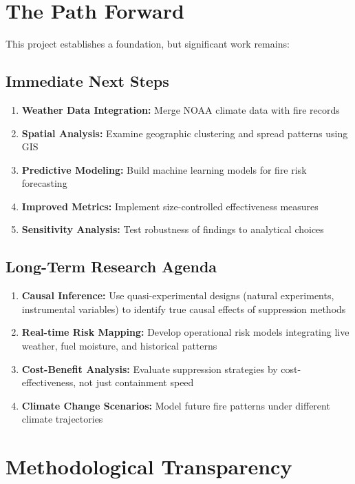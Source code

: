 \documentclass[11pt,a4paper]{article}
\begin{document}
\section{The Path Forward}

This project establishes a foundation, but significant work remains:

\subsection{Immediate Next Steps}

\begin{enumerate}
    \item \textbf{Weather Data Integration:} Merge NOAA climate data with fire records
    \item \textbf{Spatial Analysis:} Examine geographic clustering and spread patterns using GIS
    \item \textbf{Predictive Modeling:} Build machine learning models for fire risk forecasting
    \item \textbf{Improved Metrics:} Implement size-controlled effectiveness measures
    \item \textbf{Sensitivity Analysis:} Test robustness of findings to analytical choices
\end{enumerate}

\subsection{Long-Term Research Agenda}

\begin{enumerate}
    \item \textbf{Causal Inference:} Use quasi-experimental designs (natural experiments, instrumental variables) to identify true causal effects of suppression methods
    \item \textbf{Real-time Risk Mapping:} Develop operational risk models integrating live weather, fuel moisture, and historical patterns
    \item \textbf{Cost-Benefit Analysis:} Evaluate suppression strategies by cost-effectiveness, not just containment speed
    \item \textbf{Climate Change Scenarios:} Model future fire patterns under different climate trajectories
\end{enumerate}

\section{Methodological Transparency}
\end{document}
